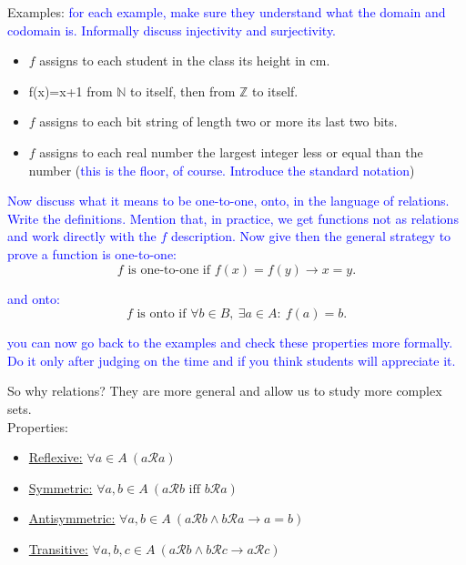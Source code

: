 \documentclass{article}
\begin{document}
Examples: \textcolor{blue}{for each example, make sure they understand what the domain and codomain is. Informally discuss injectivity and surjectivity.}

\begin{itemize}
    \item $f$ assigns to each student in the class its height in cm.
    \item f(x)=x+1 from $\mathbb{N}$ to itself, then from $\mathbb{Z}$ to itself.
    \item $f$ assigns to each bit string of length two or more its last two bits.
    \item $f$ assigns to each real number the largest integer less or equal than the number (\textcolor{blue}{this is the floor, of course. Introduce the standard notation}) 
    
\end{itemize}

\textcolor{blue}{Now discuss what it means to be one-to-one, onto, in the language of relations. Write the definitions. Mention that, in practice, we get functions not as relations and work directly with the $f$ description. Now give then the general strategy to prove a function is one-to-one:}
\[
\mbox{$f$ is one-to-one if } f(x)=f(y)\rightarrow x=y.
\]

\textcolor{blue}{and onto:}
\[
\mbox{$f$ is onto if } \forall b\in B, ~\exists a\in A:~f(a)=b. 
\]

\textcolor{blue}{you can now go back to the examples and check these properties more formally. Do it only after judging on the time and if you think students will appreciate it.}

So why relations? They are more general and allow us to study more complex sets.\\

Properties:

\begin{itemize}
    \item \underline{Reflexive:} $\forall a\in A~(a\mathcal{R}a)$
    \item \underline{Symmetric:} $\forall a, b\in A~(a\mathcal{R}b \mbox{ iff } b\mathcal{R}a)$
    \item \underline{Antisymmetric:} $\forall a, b\in A~(a\mathcal{R}b \wedge b\mathcal{R}a \rightarrow a=b)$
    \item \underline{Transitive:} $\forall a, b, c\in A~(a\mathcal{R}b \wedge b\mathcal{R}c \rightarrow a\mathcal{R}c)$
\end{itemize}
\end{document}
